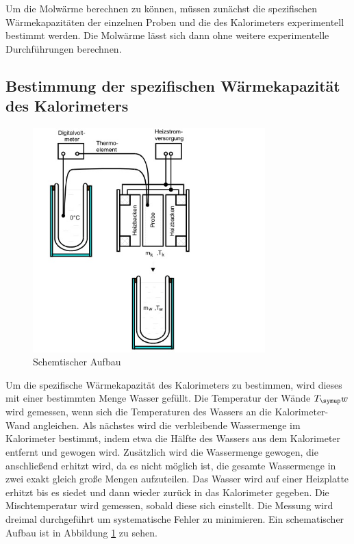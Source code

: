 Um die Molwärme berechnen zu können, müssen zunächst die spezifischen
Wärmekapazitäten der einzelnen Proben und die des Kalorimeters
experimentell bestimmt werden.
Die Molwärme lässt sich dann ohne weitere experimentelle Durchführungen
berechnen.
\subsection{Bestimmung der spezifischen Wärmekapazität des Kalorimeters}
\begin{figure}
  \centering
  \includegraphics[width=0.8\textwidth]{bilder/aufbau.jpg}
  \caption{Schemtischer Aufbau\,\cite{201}}
  \label{aufbau}
\end{figure}
Um die spezifische Wärmekapazität des Kalorimeters zu bestimmen, wird dieses
mit einer bestimmten Menge Wasser gefüllt. Die Temperatur der Wände $T_\su{w}$
wird gemessen, wenn sich die Temperaturen des Wassers an die Kalorimeter-Wand
angleichen. Als nächstes wird die verbleibende Wassermenge im Kalorimeter
bestimmt, indem etwa die Hälfte des Wassers aus dem Kalorimeter entfernt und
gewogen wird. Zusätzlich wird die Wassermenge gewogen, die anschließend erhitzt wird,
da es nicht möglich ist, die gesamte Wassermenge in zwei exakt gleich große
Mengen aufzuteilen.
Das Wasser wird auf einer Heizplatte erhitzt bis es siedet und dann
wieder zurück in das Kalorimeter gegeben. Die Mischtemperatur wird gemessen, sobald
diese sich einstellt. Die Messung wird dreimal durchgeführt um systematische
Fehler zu minimieren. Ein schematischer Aufbau ist in Abbildung \ref{aufbau}
zu sehen.
